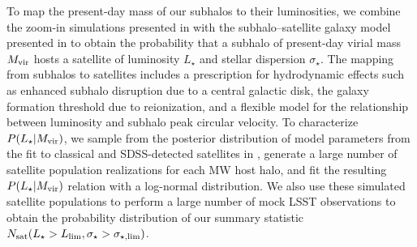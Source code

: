 To map the present-day mass of our subhalos to their luminosities, we combine the zoom-in simulations presented in \cite{Mao2015} with the subhalo--satellite galaxy model presented in \cite{Nadler:2018} to obtain the probability that a subhalo of present-day virial mass $M_{\rm{vir}}$ hosts a satellite of luminosity $L_\star$ and stellar dispersion $\sigma_\star$. The mapping from subhalos to satellites includes a prescription for hydrodynamic effects such as enhanced subhalo disruption due to a central galactic disk, the galaxy formation threshold due to reionization, and a flexible model for the relationship between luminosity and subhalo peak circular velocity. To characterize $P(L_\star|M_{\rm{vir}})$, we sample from the posterior distribution of model parameters from the fit to classical and SDSS-detected satellites in \cite{Nadler:2018}, generate a large number of satellite population realizations for each MW host halo, and fit the resulting $P(L_\star|M_{\rm{vir}})$ relation with a log-normal distribution. We also use these simulated satellite populations to perform a large number of mock LSST observations to obtain the probability distribution of our summary statistic $N_{\rm sat}(L_\star>L_{\rm lim}, \sigma_\star> \sigma_{\star,\rm lim})$.

